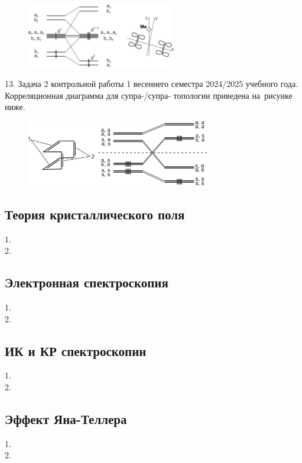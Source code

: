 \vspace{-\parskip}
\vspace{1.5mm}
\begin{figure}[h]
\includegraphics[width=6.5cm]{images/Fig_2_1_12_dec.png}
\centering
\end{figure}
\par
13. Задача 2 контрольной работы 1 весеннего семестра 2024/2025 учебного года. Корреляционная диаграмма для супра-/супра- топологии приведена на~рисунке ниже.
\vspace{-\parskip}
\vspace{1.5mm}
\begin{figure}[h]
\includegraphics[width=8cm]{images/Fig_2_1_13_dec.png}
\centering
\end{figure}
\par
\vspace{-\parskip}
\newpage

\subsection{Теория кристаллического поля}
1. \\
2. 
\newpage

\subsection{Электронная спектроскопия}
1. \\
2. 
\newpage

\subsection{ИК и КР спектроскопии}
1. \\
2. 
\newpage

\subsection{Эффект Яна-Теллера}
1. \\
2. 
\newpage

